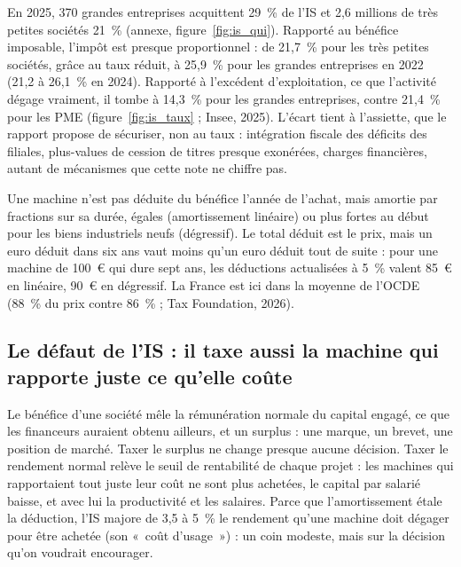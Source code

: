 En 2025, 370 grandes entreprises acquittent 29~\% de l'IS et 2,6 millions de très petites sociétés 21~\% (annexe,
figure~\ref{fig:is_qui}). Rapporté au bénéfice imposable, l'impôt est presque proportionnel : de 21,7~\% pour les très
petites sociétés, grâce au taux réduit, à 25,9~\% pour les grandes entreprises en 2022 (21,2 à 26,1~\% en 2024).
Rapporté à l'excédent d'exploitation, ce que l'activité dégage vraiment, il tombe à 14,3~\% pour les grandes
entreprises, contre 21,4~\% pour les PME (figure~\ref{fig:is_taux} ; Insee, 2025). L'écart tient à l'assiette, que
le rapport propose de sécuriser, non au taux : intégration fiscale des déficits des filiales, plus-values de cession
de titres presque exonérées, charges financières, autant de mécanismes que cette note ne chiffre pas.


Une machine n'est pas déduite du bénéfice l'année de l'achat, mais amortie par fractions sur sa durée, égales
(amortissement linéaire) ou plus fortes au début pour les biens industriels neufs (dégressif). Le total déduit est le
prix, mais un euro déduit dans six ans vaut moins qu'un euro déduit tout de suite : pour une machine de 100~€ qui dure
sept ans, les déductions actualisées à 5~\% valent 85~€ en linéaire, 90~€ en dégressif. La France est ici dans la
moyenne de l'OCDE (88~\% du prix contre 86~\% ; Tax Foundation, 2026).

\subsection{Le défaut de l'IS : il taxe aussi la machine qui rapporte juste ce qu'elle coûte}\label{sec:is_probleme}

Le bénéfice d'une société mêle la rémunération normale du capital engagé, ce que les financeurs auraient obtenu
ailleurs, et un surplus : une marque, un brevet, une position de marché. Taxer le surplus ne change presque aucune
décision. Taxer le rendement normal relève le seuil de rentabilité de chaque projet : les machines qui rapportaient
tout juste leur coût ne sont plus achetées, le capital par salarié baisse, et avec lui la productivité et les salaires.
Parce que l'amortissement étale la déduction, l'IS majore de 3,5 à 5~\% le rendement qu'une machine doit dégager pour
être achetée (son «~coût d'usage~») : un coin modeste, mais sur la décision qu'on voudrait encourager.


